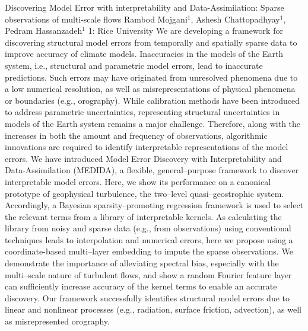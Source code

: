 \begin{addmargin}[2em]{0em}
\vspace{1.5ex}
\abs
{Discovering Model Error with interpretability and Data-Assimilation: Sparse observations of multi-scale flows}
{Rambod Mojgani$^{1}$, Ashesh Chattopadhyay$^{1}$, Pedram Hassanzadeh$^{1}$}
{1: Rice University}
{We are developing a framework for discovering structural model errors from temporally and spatially sparse data to improve accuracy of climate models. Inaccuracies in the models of the Earth system, i.e., structural and parametric model errors, lead to inaccurate predictions. Such errors may have originated from unresolved phenomena due to a low numerical resolution, as well as misrepresentations of physical phenomena or boundaries (e.g., orography). While calibration methods have been introduced to address parametric uncertainties, representing structural uncertainties in models of the Earth system remains a major challenge. Therefore, along with the increases in both the amount and frequency of observations, algorithmic innovations are required to identify interpretable representations of the model errors. We have introduced Model Error Discovery with Interpretability and Data-Assimilation (MEDIDA), a flexible, general--purpose framework to discover interpretable model errors. Here, we show its performance on a canonical prototype of geophysical turbulence, the two--level quasi--geostrophic system. Accordingly, a Bayesian sparsity--promoting regression framework is used to select the relevant terms from a library of interpretable kernels. As calculating the library from noisy and sparse data (e.g., from observations) using conventional techniques leads to interpolation and numerical errors, here we propose using a coordinate-based multi--layer embedding to impute the sparse observations. We demonstrate the importance of alleviating spectral bias, especially with the multi--scale nature of turbulent flows, and show a random Fourier feature layer can sufficiently increase accuracy of the kernel terms to enable an accurate discovery. Our framework successfully identifies structural model errors due to linear and nonlinear processes (e.g., radiation, surface friction, advection), as well as misrepresented orography.}



\end{addmargin}
